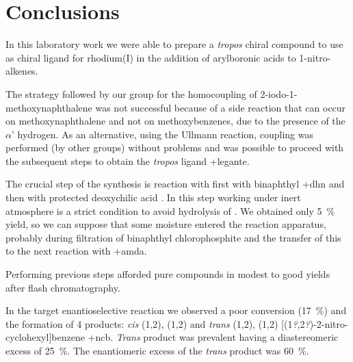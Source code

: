 \chapter{Conclusions}
In this laboratory work we were able to prepare a \emph{tropos} chiral compound to use as chiral ligand for rhodium(I) in the addition of aryl\-boronic acids to 1-nitro-alkenes.

The strategy followed by our group for the homocoupling of 2-iodo-1-methoxy\-naphthalene was not successful because of a side reaction that can occur on methoxy\-naphthalene and not on methoxy\-benzenes, due to the presence of the $\alpha$' hydrogen.
As an alternative, using the Ullmann reaction, coupling was performed (by other groups) without problems and was possible to proceed with the subsequent steps to obtain the \emph{tropos} ligand \cmpd+{legante}.

The crucial step of the synthesis is reaction with  first with binaphthyl \cmpd+{dhn} and then with protected deoxychilic acid . In this step working under inert atmosphere is a strict condition to avoid hydrolysis of . %
We obtained only 5~\% yield, so we can suppose that some moisture entered the reaction apparatus, probably during filtration of binaphthyl chloro\-phosphite and the transfer of this to the next reaction with \cmpd+{amda}.

Performing previous steps afforded pure compounds in modest to good yields after flash chromatography.

In the target enantio\-selective reaction we observed a poor conversion (17~\%) and the formation of 4 products: \emph{cis} (1\rS,2\rS), (1\Rs,2\Rs) and \emph{trans} (1\rS,2\Rs), (1\Rs,2\rS) [(1{\slshape ?},2{\slshape ?})-2-nitro-cyclo\-hexyl]benzene \cmpd+{ncb}. \emph{Trans} product was prevalent having a diastereo\-meric excess of 25~\%. The enantio\-meric excess of the \emph{trans} product was 60~\%.